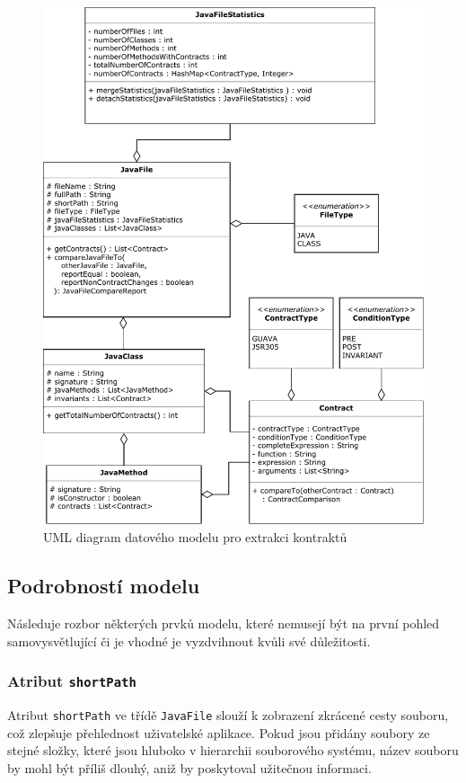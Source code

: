 				\begin{figure}[!htb]
						\centering
						\includegraphics[width=1\textwidth]{img/modelExtractorDiagram.pdf}
						\caption[modelExtractorDiagram]{UML diagram datového modelu pro extrakci kontraktů}
						\label{modelExtractorDiagram}
					\endminipage\hfill
				\end{figure}				
			
			\subsection{Podrobností modelu}
				Následuje rozbor některých prvků modelu, které nemusejí být na první pohled samovysvětlující či je vhodné je vyzdvihnout kvůli své důležitosti.
				
				\subsubsection{Atribut \texttt{shortPath}}				
					Atribut \texttt{shortPath} ve třídě \texttt{JavaFile} slouží k zobrazení zkrácené cesty souboru, což zlepšuje přehlednost uživatelské aplikace. Pokud jsou přidány soubory ze stejné složky, které jsou hluboko v hierarchii souborového systému, název souboru by mohl být příliš dlouhý, aniž by poskytoval užitečnou informaci.\\
					
